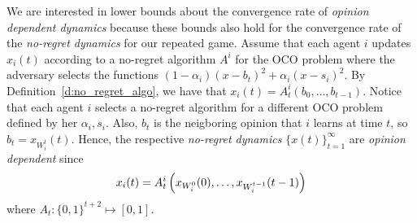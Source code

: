 


We are interested in lower bounds about the convergence rate of
\emph{opinion dependent dynamics} because these bounds also hold
for the convergence rate of the \emph{no-regret dynamics} for our repeated game.
Assume that each agent $i$ updates $x_i(t)$ according to a no-regret algorithm $A^i$
for the OCO problem where the adversary selects the functions
$(1-\alpha_i)(x-b_t)^2 + \alpha_i(x-s_i)^2$. By Definition~\ref{d:no_regret_algo},
we have that $x_i(t)= A^i_t(b_0, \ldots, b_{t-1})$. Notice that
each agent $i$ selects a no-regret algorithm for a different OCO
problem defined by her $\alpha_i,s_i$. 
Also, $b_t$ is the neigboring opinion that $i$ learns at time $t$, 
so $b_t = x_{W_i^t}(t)$.
Hence, the respective \emph{no-regret dynamics} $\{x(t)\}_{t=1}^\infty$
are \emph{opinion dependent} since 
\[x_i(t) = A^i_t\left(x_{W_i^0}(0),\ldots,x_{W_i^{t-1}}(t-1)\right)\]
where $A_t:\{0,1\}^{t+2} \mapsto [0,1]$. 


